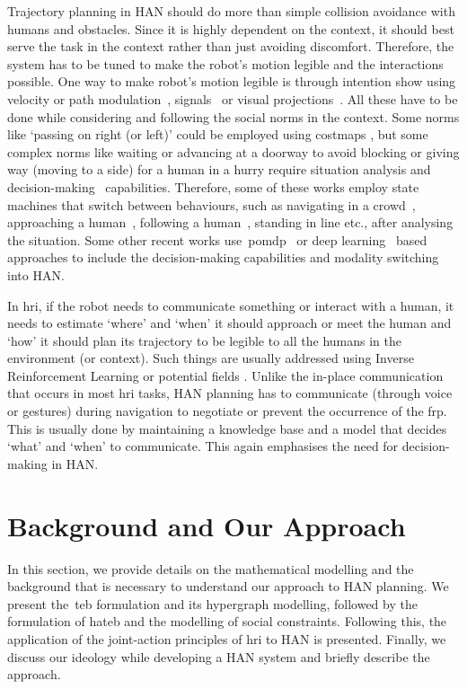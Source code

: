 Trajectory planning in HAN should do more than simple collision avoidance with humans and obstacles. Since it is highly dependent on the context, it should best serve the task in the context rather than just avoiding discomfort. Therefore, the system has to be tuned to make the robot's motion legible and the interactions possible. One way to make robot's motion legible is through intention show using velocity or path modulation~\cite{kruse2014evaluating, lichtenthaler2013towards}, signals~\cite{may2015show} or visual projections~\cite{shrestha2018communicating}. All these have to be done while considering and following the social norms in the context. Some norms like `passing on right (or left)' could be employed using costmaps \cite{lu2013towards}, but some complex norms like waiting or advancing at a doorway to avoid blocking or giving way (moving to a side) for a human in a hurry require situation analysis and decision-making~\cite{zender2007human, granata2012framework, feil2011people, hayashi2012friendly} capabilities. Therefore, some of these works employ state machines that switch between behaviours, such as navigating in a crowd~\cite{dugas2020ian}, approaching a human~\cite{hayashi2012friendly}, following a human~\cite{zender2007human}, standing in line etc., after analysing the situation. Some other recent works use~\acrshort{pomdp}~\cite{qian2013decision} or deep learning~\cite{banisetty2020deep} based approaches to include the decision-making capabilities and modality switching into HAN.

In \acrshort{hri}, if the robot needs to communicate something or interact with a human, it needs to estimate `where' and `when' it should approach or meet the human and `how' it should plan its trajectory to be legible to all the humans in the environment (or context). Such things are usually addressed using Inverse Reinforcement Learning \cite{ramirez2016robots} or potential fields \cite{hansen2009adaptive}. Unlike the in-place communication that occurs in most \acrshort{hri} tasks, HAN planning has to communicate (through voice or gestures) during navigation to negotiate or prevent the occurrence of the \acrshort{frp}. This is usually done by maintaining a knowledge base and a model \cite{dugas2020ian} that decides `what' and `when' to communicate. This again emphasises the need for decision-making in HAN.

\section{Background and Our Approach}
In this section, we provide details on the mathematical modelling and the background that is necessary to understand our approach to HAN planning. We present the~\acrshort{teb} formulation and its hypergraph modelling, followed by the formulation of \acrshort{hateb} and the modelling of social constraints. Following this, the application of the joint-action principles of \acrshort{hri} to HAN is presented. Finally, we discuss our ideology while developing a HAN system and briefly describe the approach.


